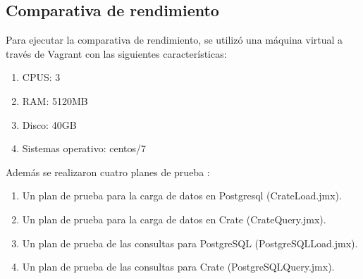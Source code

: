 \documentclass[11pt, twocolumns]{article}
\begin{document}
\begin{multicols}{2}
\section{Comparativa de rendimiento}
Para ejecutar la comparativa de rendimiento, se utilizó una máquina virtual a través de Vagrant con las siguientes características:
\begin{enumerate}
  \item CPUS: 3
  \item RAM: 5120MB
  \item Disco: 40GB
  \item Sistemas operativo: centos/7
\end{enumerate}
Además se realizaron cuatro planes de prueba \cite{matam2017performance}:
\begin{enumerate}
  \item Un plan de prueba para la carga de datos en Postgresql (CrateLoad.jmx).
  \item Un plan de prueba para la carga de datos en Crate (CrateQuery.jmx).
  \item Un plan de prueba de las consultas para PostgreSQL (PostgreSQLLoad.jmx).
  \item Un plan de prueba de las consultas para Crate (PostgreSQLQuery.jmx).
\end{enumerate}


\end{multicols}
\end{document}
